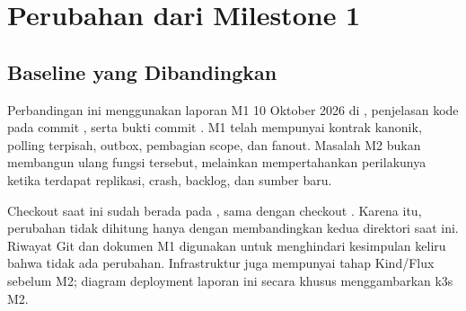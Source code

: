 \chapter{Perubahan dari Milestone 1}
\section{Baseline yang Dibandingkan}
Perbandingan ini menggunakan laporan M1 10 Oktober 2026 di , penjelasan kode pada commit , serta bukti commit . M1 telah mempunyai kontrak kanonik, polling terpisah, outbox, pembagian scope, dan fanout. Masalah M2 bukan membangun ulang fungsi tersebut, melainkan mempertahankan perilakunya ketika terdapat replikasi, crash, backlog, dan sumber baru.

Checkout  saat ini sudah berada pada , sama dengan checkout . Karena itu, perubahan tidak dihitung hanya dengan membandingkan kedua direktori saat ini. Riwayat Git dan dokumen M1 digunakan untuk menghindari kesimpulan keliru bahwa tidak ada perubahan. Infrastruktur juga mempunyai tahap Kind/Flux sebelum M2; diagram deployment laporan ini secara khusus menggambarkan k3s M2.

